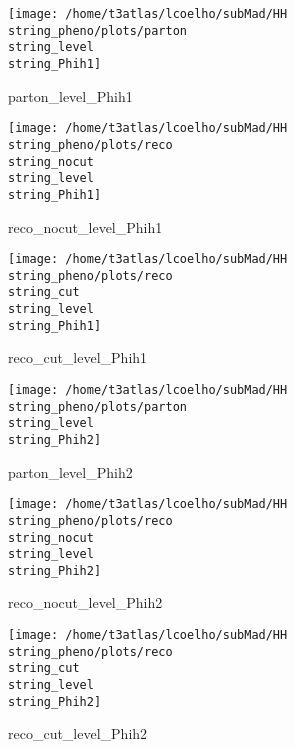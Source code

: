 \documentclass[a4paper,onecolumn,final,11pt]{article}
\begin{document}
\begin{figure}[H] 
\centering 
\begin{minipage}{.32\textwidth} 
        \centering 
        \hspace{0cm} 
        \texttt{[image: /home/t3atlas/lcoelho/subMad/HH\\string\_pheno/plots/parton\\string\_level\\string\_Phih1]} 
        \caption{parton_level_Phih1} 
\end{minipage} 
\hfill 
\begin{minipage}{.32\textwidth} 
        \centering 
        \hspace{0cm} 
    \texttt{[image: /home/t3atlas/lcoelho/subMad/HH\\string\_pheno/plots/reco\\string\_nocut\\string\_level\\string\_Phih1]} 
        \caption{reco_nocut_level_Phih1} 
\end{minipage} 
\hfill 
\begin{minipage}{.32\textwidth} 
        \centering 
        \hspace{0cm} 
    \texttt{[image: /home/t3atlas/lcoelho/subMad/HH\\string\_pheno/plots/reco\\string\_cut\\string\_level\\string\_Phih1]} 
        \caption{reco_cut_level_Phih1} 
\end{minipage} 
\end{figure} 
 
\begin{figure}[H] 
\centering 
\begin{minipage}{.32\textwidth} 
        \centering 
        \hspace{0cm} 
        \texttt{[image: /home/t3atlas/lcoelho/subMad/HH\\string\_pheno/plots/parton\\string\_level\\string\_Phih2]} 
        \caption{parton_level_Phih2} 
\end{minipage} 
\hfill 
\begin{minipage}{.32\textwidth} 
        \centering 
        \hspace{0cm} 
    \texttt{[image: /home/t3atlas/lcoelho/subMad/HH\\string\_pheno/plots/reco\\string\_nocut\\string\_level\\string\_Phih2]} 
        \caption{reco_nocut_level_Phih2} 
\end{minipage} 
\hfill 
\begin{minipage}{.32\textwidth} 
        \centering 
        \hspace{0cm} 
    \texttt{[image: /home/t3atlas/lcoelho/subMad/HH\\string\_pheno/plots/reco\\string\_cut\\string\_level\\string\_Phih2]} 
        \caption{reco_cut_level_Phih2} 
\end{minipage} 
\end{figure} 
 
\end{document}
